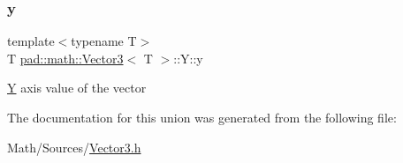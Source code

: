 \mbox{\label{unionpad_1_1math_1_1_vector3_1_1_y_a7226429e99afe23bdb947736bfeb93fa}} 
\subsubsection{\texorpdfstring{y}{y}}
{\footnotesize\ttfamily template$<$typename T$>$ \\
T \mbox{\hyperlink{structpad_1_1math_1_1_vector3}{pad\+::math\+::\+Vector3}}$<$ T $>$\+::Y\+::y}

\mbox{\hyperlink{unionpad_1_1math_1_1_vector3_1_1_y}{Y}} axis value of the vector 

The documentation for this union was generated from the following file\+:\begin{DoxyCompactItemize}
\item 
Math/\+Sources/\mbox{\hyperlink{_vector3_8h}{Vector3.\+h}}\end{DoxyCompactItemize}
